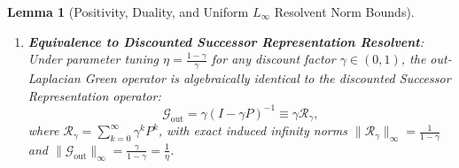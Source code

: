 \documentclass[11pt,a4paper]{article}
\newtheorem{lemma}{Lemma}
\begin{document}
\begin{lemma}[Positivity, Duality, and Uniform $L_\infty$ Resolvent Norm Bounds]
\begin{enumerate}
    \item \textbf{Equivalence to Discounted Successor Representation Resolvent}: Under parameter tuning $\eta = \frac{1 - \gamma}{\gamma}$ for any discount factor $\gamma \in (0, 1)$, the out-Laplacian Green operator is algebraically identical to the discounted Successor Representation operator:
    \begin{equation}
    \label{eq:g_out_sr_identity_lem}
    \mathcal{G}_{\text{out}} = \gamma (I - \gamma P)^{-1} \equiv \gamma \mathcal{R}_\gamma,
    \end{equation}
    where $\mathcal{R}_\gamma = \sum_{k=0}^\infty \gamma^k P^k$, with exact induced infinity norms $\|\mathcal{R}_\gamma\|_\infty = \frac{1}{1 - \gamma}$ and $\|\mathcal{G}_{\text{out}}\|_\infty = \frac{\gamma}{1 - \gamma} = \frac{1}{\eta}$.
\end{enumerate}
\end{lemma}
\end{document}
